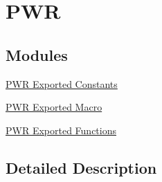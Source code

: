 \hypertarget{group___p_w_r}{}\section{P\+WR}
\label{group___p_w_r}
\subsection*{Modules}
\begin{DoxyCompactItemize}
\item 
\hyperlink{group___p_w_r___exported___constants}{P\+W\+R Exported Constants}
\item 
\hyperlink{group___p_w_r___exported___macro}{P\+W\+R Exported Macro}
\item 
\hyperlink{group___p_w_r___exported___functions}{P\+W\+R Exported Functions}
\end{DoxyCompactItemize}


\subsection{Detailed Description}
